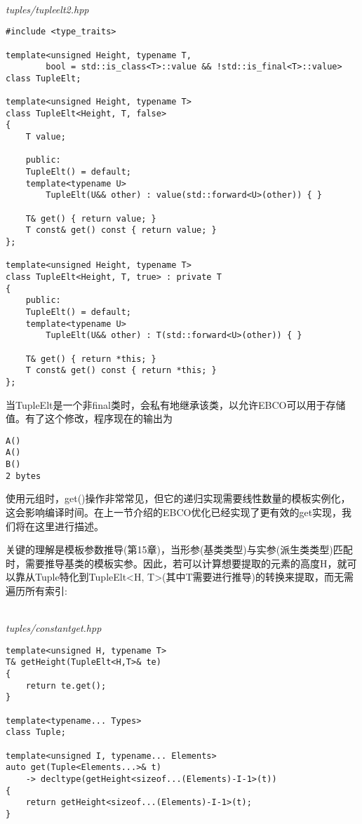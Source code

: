\hspace*{\fill} \\ %
\noindent
\textit{tuples/tupleelt2.hpp}
\begin{lstlisting}[style=styleCXX]
#include <type_traits>

template<unsigned Height, typename T,
		bool = std::is_class<T>::value && !std::is_final<T>::value>
class TupleElt;

template<unsigned Height, typename T>
class TupleElt<Height, T, false>
{
	T value;
	
	public:
	TupleElt() = default;
	template<typename U>
		TupleElt(U&& other) : value(std::forward<U>(other)) { }
		
	T& get() { return value; }
	T const& get() const { return value; }
};

template<unsigned Height, typename T>
class TupleElt<Height, T, true> : private T
{
	public:
	TupleElt() = default;
	template<typename U>
		TupleElt(U&& other) : T(std::forward<U>(other)) { }
		
	T& get() { return *this; }
	T const& get() const { return *this; }
};
\end{lstlisting}

当TupleElt是一个非final类时，会私有地继承该类，以允许EBCO可以用于存储值。有了这个修改，程序现在的输出为

\begin{lstlisting}[style=styleCXX]
A()
A()
B()
2 bytes
\end{lstlisting}


使用元组时，get()操作非常常见，但它的递归实现需要线性数量的模板实例化，这会影响编译时间。在上一节介绍的EBCO优化已经实现了更有效的get实现，我们将在这里进行描述。

关键的理解是模板参数推导(第15章)，当形参(基类类型)与实参(派生类类型)匹配时，需要推导基类的模板实参。因此，若可以计算想要提取的元素的高度H，就可以靠从Tuple特化到TupleElt<H, T>(其中T需要进行推导)的转换来提取，而无需遍历所有索引:

\hspace*{\fill} \\ %
\noindent
\textit{tuples/constantget.hpp}
\begin{lstlisting}[style=styleCXX]
template<unsigned H, typename T>
T& getHeight(TupleElt<H,T>& te)
{
	return te.get();
}

template<typename... Types>
class Tuple;

template<unsigned I, typename... Elements>
auto get(Tuple<Elements...>& t)
	-> decltype(getHeight<sizeof...(Elements)-I-1>(t))
{
	return getHeight<sizeof...(Elements)-I-1>(t);
}
\end{lstlisting}

